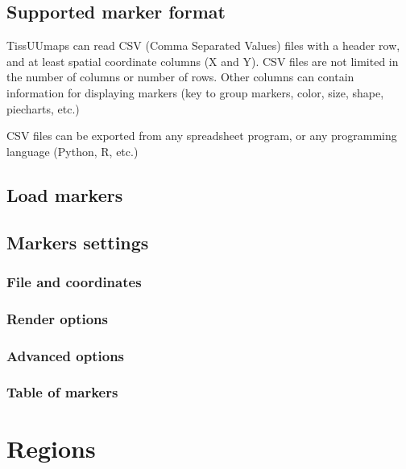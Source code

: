 \documentclass[letterpaper,10pt,english,openany,oneside]{sphinxmanual}
\begin{document}
\subsection{Supported marker format}
\label{\detokenize{docs/starting/markers:supported-marker-format}}
\sphinxAtStartPar
TissUUmaps can read CSV (Comma Separated Values) files with a header row, and at least spatial coordinate columns (X and Y). CSV files are not limited in the number of columns or number of rows. Other columns can contain information for displaying markers (key to group markers, color, size, shape, piecharts, etc.)

\sphinxAtStartPar
CSV files can be exported from any spreadsheet program, or any programming language (Python, R, etc.)


\subsection{Load markers}
\label{\detokenize{docs/starting/markers:load-markers}}

\subsection{Markers settings}
\label{\detokenize{docs/starting/markers:markers-settings}}

\subsubsection{File and coordinates}
\label{\detokenize{docs/starting/markers:file-and-coordinates}}

\subsubsection{Render options}
\label{\detokenize{docs/starting/markers:render-options}}

\subsubsection{Advanced options}
\label{\detokenize{docs/starting/markers:advanced-options}}

\subsubsection{Table of markers}
\label{\detokenize{docs/starting/markers:table-of-markers}}
\sphinxstepscope


\section{Regions}
\label{\detokenize{docs/starting/regions:regions}}\label{\detokenize{docs/starting/regions::doc}}
\end{document}
